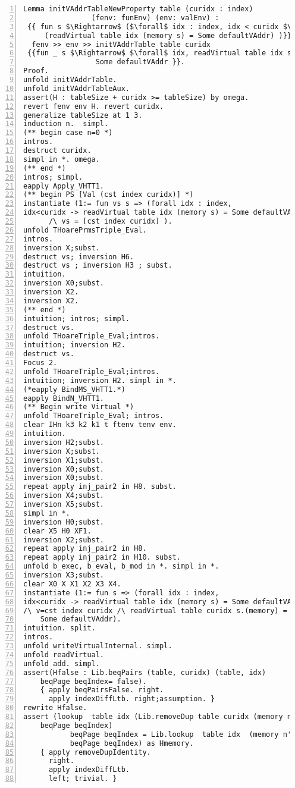 \begin{appendices}
\begin{lstlisting}[xleftmargin=-.1\textwidth,
xrightmargin=-.1\textwidth,
mathescape=true,numbers=left]
Lemma initVAddrTableNewProperty table (curidx : index) 
                (fenv: funEnv) (env: valEnv) :
 {{ fun s $\Rightarrow$ ($\forall$ idx : index, idx < curidx $\rightarrow$ 
     (readVirtual table idx (memory s) = Some defaultVAddr) )}} 
  fenv >> env >> initVAddrTable table curidx 
 {{fun _ s $\Rightarrow$ $\forall$ idx, readVirtual table idx s.(memory) = 
 	             Some defaultVAddr }}. 
Proof.
unfold initVAddrTable.
unfold initVAddrTableAux.
assert(H : tableSize + curidx >= tableSize) by omega.
revert fenv env H. revert curidx.
generalize tableSize at 1 3. 
induction n.  simpl. 
(** begin case n=0 *)
intros.
destruct curidx.
simpl in *. omega.
(** end *)
intros; simpl.
eapply Apply_VHTT1.
(** begin PS [Val (cst index curidx)] *)
instantiate (1:= fun vs s => (forall idx : index,
idx<curidx -> readVirtual table idx (memory s) = Some defaultVAddr) 
      /\ vs = [cst index curidx] ).
unfold THoarePrmsTriple_Eval.
intros.
inversion X;subst.
destruct vs; inversion H6.
destruct vs ; inversion H3 ; subst.
intuition.
inversion X0;subst.
inversion X2.
inversion X2.
(** end *)
intuition; intros; simpl.
destruct vs.
unfold THoareTriple_Eval;intros.
intuition; inversion H2.
destruct vs.
Focus 2.
unfold THoareTriple_Eval;intros.
intuition; inversion H2. simpl in *.
(*eapply BindMS_VHTT1.*)
eapply BindN_VHTT1.
(** Begin write Virtual *)
unfold THoareTriple_Eval; intros.
clear IHn k3 k2 k1 t ftenv tenv env.
intuition.
inversion H2;subst.
inversion X;subst.
inversion X1;subst.
inversion X0;subst.
inversion X0;subst.
repeat apply inj_pair2 in H8. subst.
inversion X4;subst.
inversion X5;subst.
simpl in *.
inversion H0;subst.
clear X5 H0 XF1.
inversion X2;subst.
repeat apply inj_pair2 in H8.
repeat apply inj_pair2 in H10. subst.
unfold b_exec, b_eval, b_mod in *. simpl in *.
inversion X3;subst.
clear X0 X X1 X2 X3 X4.
instantiate (1:= fun s => (forall idx : index,
idx<curidx -> readVirtual table idx (memory s) = Some defaultVAddr) 
/\ v=cst index curidx /\ readVirtual table curidx s.(memory) = 
    Some defaultVAddr).
intuition. split.
intros.
unfold writeVirtualInternal. simpl.
unfold readVirtual.
unfold add. simpl.
assert(Hfalse : Lib.beqPairs (table, curidx) (table, idx) 
	beqPage beqIndex= false).
    { apply beqPairsFalse. right.
      apply indexDiffLtb. right;assumption. }
rewrite Hfalse.
assert (lookup  table idx (Lib.removeDup table curidx (memory n') 
	beqPage beqIndex)
           beqPage beqIndex = Lib.lookup  table idx  (memory n') 
           beqPage beqIndex) as Hmemory.
    { apply removeDupIdentity.
      right. 
      apply indexDiffLtb.
      left; trivial. }

\end{lstlisting}
\end{appendices}
